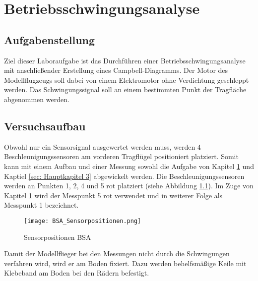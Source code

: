 \chapter{Betriebsschwingungsanalyse}
\label{sec: Hauptkapitel 2}


\section{Aufgabenstellung}
    Ziel dieser Laboraufgabe ist das Durchführen einer Betriebsschwingungsanalyse
    mit anschließender Erstellung eines Campbell-Diagramms. Der Motor des
    Modellflugzeugs soll dabei von einem Elektromotor ohne Verdichtung
    geschleppt werden. Das Schwingungssignal soll an einem bestimmten Punkt der
    Tragfläche abgenommen werden.

\section{Versuchsaufbau}
    Obwohl nur ein Sensorsignal ausgewertet werden muss, werden 4
    Beschleunigungssensoren am vorderen Tragflügel positioniert platziert.
    Somit kann mit einem Aufbau und einer Messung sowohl die Aufgabe von Kapitel
    \ref{sec: Hauptkapitel 2} und Kaptiel \ref{sec: Hauptkapitel 3}
    abgewickelt werden. Die Beschleunigungssensoren werden an Punkten 1, 2, 4 und
    5 rot platziert (siehe Abbildung \ref{fig: Sensorpos_BSA}). Im Zuge von
    Kapitel \ref{sec: Hauptkapitel 2} wird der Messpunkt 5 rot verwendet und in
    weiterer Folge als Messpunkt 1 bezeichnet.

    \begin{figure}[H]
        \centering
        \texttt{[image: BSA\_Sensorpositionen.png]}
        \caption{Sensorpositionen BSA}
        \label{fig: Sensorpos_BSA}
    \end{figure}

    \noindent
    Damit der Modellflieger bei den Messungen nicht durch die Schwingungen
    verfahren wird, wird er am Boden fixiert. Dazu werden behelfsmäßige Keile mit
    Klebeband am Boden bei den Rädern befestigt.
    \\


